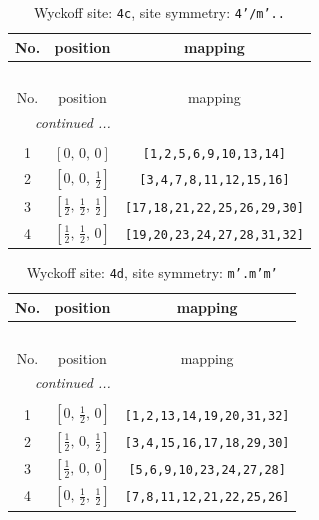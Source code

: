 \documentclass[fleqn,8pt]{jsarticle}
\begin{document}
\renewcommand{\arraystretch}{1.2}
\begin{longtable}{ccc}
\caption{Wyckoff site: {\tt 4c}, site symmetry: {\tt 4'/m'..}}
 \\
 \hline \hline
No. & position & mapping \\ \hline \endfirsthead

\multicolumn{2}{l}{\tablename\ \thetable{}} \\
 \hline \hline
No. & position & mapping \\ \hline \endhead

 \hline \hline
\multicolumn{2}{r}{\footnotesize\it continued ...} \\ \endfoot

 \hline \hline
\multicolumn{2}{r}{} \\ \endlastfoot

1 & $\left[ 0,\, 0,\, 0 \right]$ & {\tt [1,2,5,6,9,10,13,14]} \\ \hline
2 & $\left[ 0,\, 0,\, \frac{1}{2} \right]$ & {\tt [3,4,7,8,11,12,15,16]} \\ \hline
3 & $\left[ \frac{1}{2},\, \frac{1}{2},\, \frac{1}{2} \right]$ & {\tt [17,18,21,22,25,26,29,30]} \\ \hline
4 & $\left[ \frac{1}{2},\, \frac{1}{2},\, 0 \right]$ & {\tt [19,20,23,24,27,28,31,32]} \\
\end{longtable}
\renewcommand{\arraystretch}{1.2}
\begin{longtable}{ccc}
\caption{Wyckoff site: {\tt 4d}, site symmetry: {\tt m'.m'm'}}
 \\
 \hline \hline
No. & position & mapping \\ \hline \endfirsthead

\multicolumn{2}{l}{\tablename\ \thetable{}} \\
 \hline \hline
No. & position & mapping \\ \hline \endhead

 \hline \hline
\multicolumn{2}{r}{\footnotesize\it continued ...} \\ \endfoot

 \hline \hline
\multicolumn{2}{r}{} \\ \endlastfoot

1 & $\left[ 0,\, \frac{1}{2},\, 0 \right]$ & {\tt [1,2,13,14,19,20,31,32]} \\ \hline
2 & $\left[ \frac{1}{2},\, 0,\, \frac{1}{2} \right]$ & {\tt [3,4,15,16,17,18,29,30]} \\ \hline
3 & $\left[ \frac{1}{2},\, 0,\, 0 \right]$ & {\tt [5,6,9,10,23,24,27,28]} \\ \hline
4 & $\left[ 0,\, \frac{1}{2},\, \frac{1}{2} \right]$ & {\tt [7,8,11,12,21,22,25,26]} \\
\end{longtable}
\end{document}
